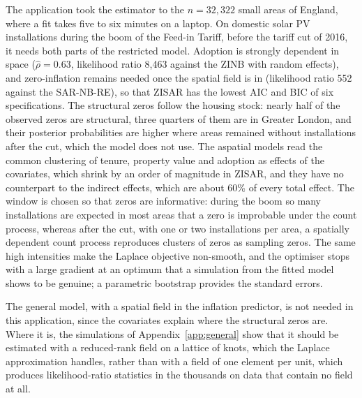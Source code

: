 The application took the estimator to the $n = 32{,}322$ small areas of England, where a fit takes five to six minutes on a laptop.
On domestic solar PV installations during the boom of the Feed-in Tariff, before the tariff cut of 2016, it needs both parts of the restricted model.
Adoption is strongly dependent in space ($\hat\rho = 0.63$, likelihood ratio 8{,}463 against the ZINB with random effects), and zero-inflation remains needed once the spatial field is in (likelihood ratio 552 against the SAR-NB-RE), so that ZISAR has the lowest AIC and BIC of six specifications.
The structural zeros follow the housing stock: nearly half of the observed zeros are structural, three quarters of them are in Greater London, and their posterior probabilities are higher where areas remained without installations after the cut, which the model does not use.
The aspatial models read the common clustering of tenure, property value and adoption as effects of the covariates, which shrink by an order of magnitude in ZISAR, and they have no counterpart to the indirect effects, which are about 60\% of every total effect.
The window is chosen so that zeros are informative: during the boom so many installations are expected in most areas that a zero is improbable under the count process, whereas after the cut, with one or two installations per area, a spatially dependent count process reproduces clusters of zeros as sampling zeros.
The same high intensities make the Laplace objective non-smooth, and the optimiser stops with a large gradient at an optimum that a simulation from the fitted model shows to be genuine; a parametric bootstrap provides the standard errors.

The general model, with a spatial field in the inflation predictor, is not needed in this application, since the covariates explain where the structural zeros are.
Where it is, the simulations of Appendix~\ref{app:general} show that it should be estimated with a reduced-rank field on a lattice of knots, which the Laplace approximation handles, rather than with a field of one element per unit, which produces likelihood-ratio statistics in the thousands on data that contain no field at all.

